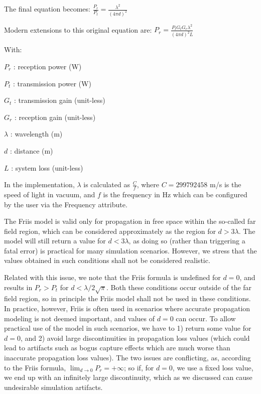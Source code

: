 The final equation becomes\+: $ \frac{P_r}{P_t} = \frac{\lambda^2}{(4 \pi d)^2} $

Modern extensions to this original equation are\+: $ P_r = \frac{P_t G_t G_r \lambda^2}{(4 \pi d)^2 L}$

With\+:
\begin{DoxyItemize}
\item $ P_r $ \+: reception power (W)
\item $ P_t $ \+: transmission power (W)
\item $ G_t $ \+: transmission gain (unit-\/less)
\item $ G_r $ \+: reception gain (unit-\/less)
\item $ \lambda $ \+: wavelength (m)
\item $ d $ \+: distance (m)
\item $ L $ \+: system loss (unit-\/less)
\end{DoxyItemize}

In the implementation, $ \lambda $ is calculated as $ \frac{C}{f} $, where $ C = 299792458$ m/s is the speed of light in vacuum, and $ f $ is the frequency in Hz which can be configured by the user via the Frequency attribute.

The Friis model is valid only for propagation in free space within the so-\/called far field region, which can be considered approximately as the region for $ d > 3 \lambda $. The model will still return a value for $ d < 3 \lambda $, as doing so (rather than triggering a fatal error) is practical for many simulation scenarios. However, we stress that the values obtained in such conditions shall not be considered realistic.

Related with this issue, we note that the Friis formula is undefined for $ d = 0 $, and results in $ P_r > P_t $ for $ d < \lambda / 2 \sqrt{\pi} $. Both these conditions occur outside of the far field region, so in principle the Friis model shall not be used in these conditions. In practice, however, Friis is often used in scenarios where accurate propagation modeling is not deemed important, and values of $ d = 0 $ can occur. To allow practical use of the model in such scenarios, we have to 1) return some value for $ d = 0 $, and 2) avoid large discontinuities in propagation loss values (which could lead to artifacts such as bogus capture effects which are much worse than inaccurate propagation loss values). The two issues are conflicting, as, according to the Friis formula, $\lim_{d \to 0 } P_r = +\infty $; so if, for $ d = 0 $, we use a fixed loss value, we end up with an infinitely large discontinuity, which as we discussed can cause undesirable simulation artifacts.

